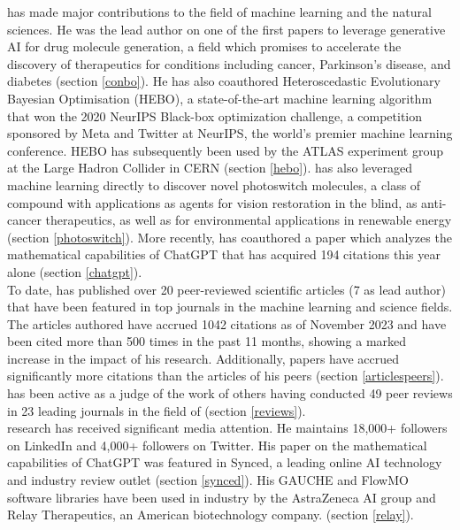 \documentclass[11pt]{article}
\begin{document}
\dr has made major contributions to the field of machine learning and the natural sciences. He was the lead author on one of the first papers to leverage generative AI for drug molecule generation, a field which promises to accelerate the discovery of therapeutics for conditions including cancer, Parkinson’s disease, and diabetes (section \ref{conbo}). He has also coauthored Heteroscedastic Evolutionary Bayesian Optimisation (HEBO), a state-of-the-art machine learning algorithm that won the 2020 NeurIPS Black-box optimization challenge, a competition sponsored by Meta and Twitter at NeurIPS, the world’s premier machine learning conference. HEBO has subsequently been used by the ATLAS experiment group at the Large Hadron Collider in CERN (section \ref{hebo}). \dr has also leveraged machine learning directly to discover novel photoswitch molecules, a class of compound with applications as agents for vision restoration in the blind, as anti-cancer therapeutics, as well as for environmental applications in renewable energy (section \ref{photoswitch}). More recently, \dr has coauthored a paper which analyzes the mathematical capabilities of ChatGPT that has acquired 194 citations this year alone (section \ref{chatgpt}). \\

To date, \dr has published over 20 peer-reviewed scientific articles (7 as lead author) that have been featured in top journals in the machine learning and science fields. The articles \dr authored have accrued 1042 citations as of November 2023 and have been cited more than 500 times in the past 11 months, showing a marked increase in the impact of his research. Additionally, \drs papers have accrued significantly more citations than the articles of his peers (section \ref{articlespeers}). \\


\dr has been active as a judge of the work of others having conducted 49 peer reviews in 23 leading journals in the field of \fie{} (section \ref{reviews}). \\


\drs research has received significant media attention. He maintains 18,000+ followers on LinkedIn and 4,000+ followers on Twitter. His paper on the mathematical capabilities of ChatGPT was featured in Synced, a leading online AI technology and industry review outlet (section \ref{synced}). His GAUCHE and FlowMO software libraries have been used in industry by the AstraZeneca AI group and Relay Therapeutics, an American biotechnology company. (section \ref{relay}). \\
\end{document}

